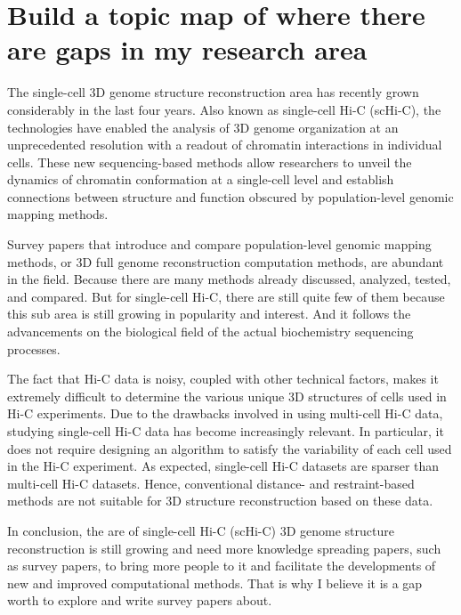 \section{Build a topic map of where there are gaps in my research area}

The single-cell 3D genome structure reconstruction area has recently grown considerably in the last four years. Also known as single-cell Hi-C (scHi-C), the technologies have enabled the analysis of 3D genome organization at an unprecedented resolution with a readout of chromatin interactions in individual cells. These new sequencing-based methods allow researchers to unveil the dynamics of chromatin conformation at a single-cell level and establish connections between structure and function obscured by population-level genomic mapping methods.

Survey papers that introduce and compare population-level genomic mapping methods, or 3D full genome reconstruction computation methods, are abundant in the field. Because there are many methods already discussed, analyzed, tested, and compared. But for single-cell Hi-C, there are still quite few of them because this sub area is still growing in popularity and interest. And it follows the advancements on the biological field of the actual biochemistry sequencing processes.

The fact that Hi-C data is noisy, coupled with other technical factors, makes it extremely difficult to determine the various unique 3D structures of cells used in Hi-C experiments. Due to the drawbacks involved in using multi-cell Hi-C data, studying single-cell Hi-C data has become increasingly relevant. In particular, it does not require designing an algorithm to satisfy the variability of each cell used in the Hi-C experiment. As expected, single-cell Hi-C datasets are sparser than multi-cell Hi-C datasets. Hence, conventional distance- and restraint-based methods are not suitable for 3D structure reconstruction based on these data.

In conclusion, the are of single-cell Hi-C (scHi-C) 3D genome structure reconstruction is still growing and need more knowledge spreading papers, such as survey papers, to bring more people to it and facilitate the developments of new and improved computational methods. That is why I believe it is a gap worth to explore and write survey papers about.